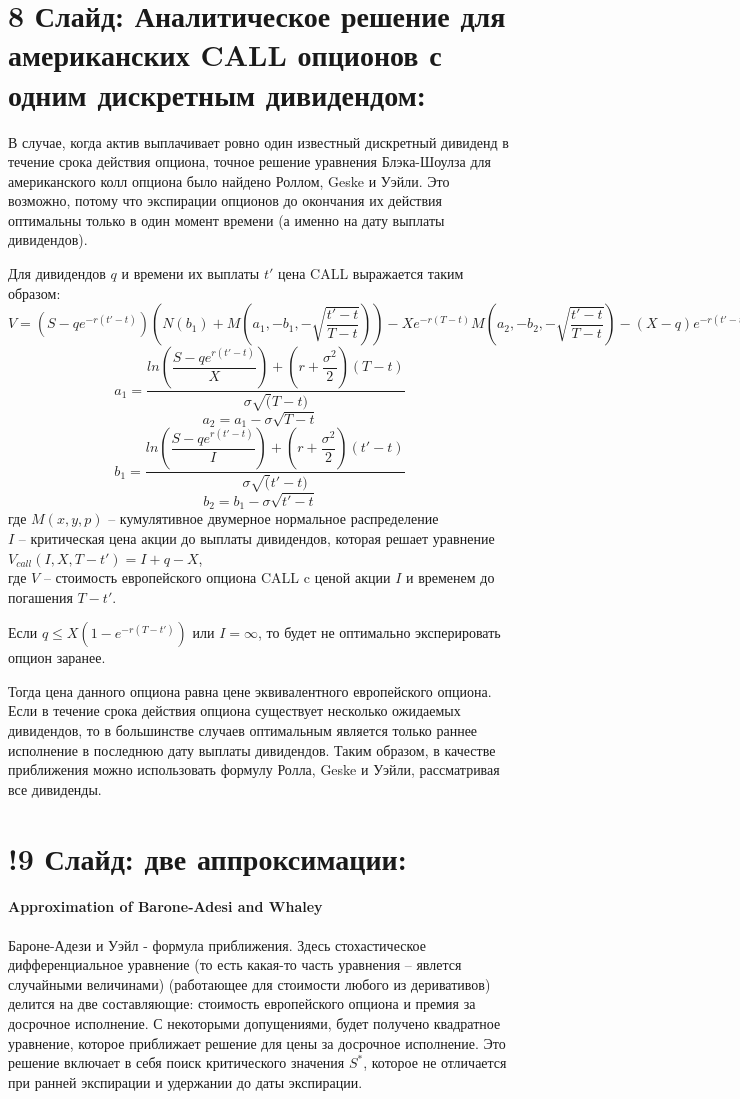 \documentclass[a4paper]{article}
\begin{document}
\section*{8 Слайд: Аналитическое решение для американских CALL опционов с одним дискретным дивидендом:}
В случае, когда актив выплачивает ровно один известный дискретный дивиденд в течение срока действия опциона, точное решение уравнения Блэка-Шоулза для американского колл опциона было найдено Роллом, Geske и Уэйли. Это возможно, потому что экспирации опционов до окончания их действия оптимальны только в один момент времени (а именно на дату выплаты дивидендов).

Для дивидендов $q$ и времени их выплаты $t'$ цена CALL выражается таким образом:
$V = \left(S - qe^{-r (t' - t)} \right) \left( N(b_1) + M \left( a_1, -b_1, - \sqrt{ \dfrac{t' - t}{T - t}} \right) \right) - Xe^{-r (T - t)}  M \left( a_2, -b_2, - \sqrt{\dfrac{t' - t}{T - t}} \right) - (X - q) e^{-r (t' - t)} N(b_2)$
\[a_1 = \dfrac{ln \left( \dfrac{S - qe^{r(t' - t)}}{X}\right) + (r + \dfrac{\sigma^2}{2}) (T-t)}{\sigma \sqrt(T - t)}\]
\[a_2 = a_1 - \sigma \sqrt{T - t}\]
\[b_1 = \dfrac{ln \left( \dfrac{S - qe^{r(t' - t)}}{I}\right) + (r + \dfrac{\sigma^2}{2}) (t'-t)}{\sigma \sqrt(t' - t)}\]
\[b_2 = b_1 - \sigma \sqrt{t' - t}\]
где $M(x,y,p)$ -- кумулятивное двумерное нормальное распределение \\
$I$ -- критическая цена акции до выплаты дивидендов, которая решает уравнение $V_{call} (I, X, T - t') = I + q - X$, \\
где $V$ -- стоимость европейского опциона CALL c ценой акции $I$ и временем до погашения $T - t'$.

Если $q \leq X (1 - e ^{-r (T - t')})$ или $I = \infty$, то будет не оптимально эксперировать опцион заранее.

Тогда цена данного опциона равна цене эквивалентного европейского опциона. Если в течение срока действия опциона существует несколько ожидаемых дивидендов, то в большинстве случаев оптимальным является только раннее исполнение в последнюю дату выплаты дивидендов. Таким образом, в качестве приближения можно использовать формулу Ролла, Geske и Уэйли, рассматривая все дивиденды.
\section*{!9 Слайд: две аппроксимации:}
\paragraph*{Approximation of Barone-Adesi and Whaley}
Бароне-Адези и Уэйл - формула приближения. Здесь стохастическое дифференциальное уравнение (то есть какая-то часть уравнения -- явлется случайными величинами) (работающее для стоимости любого из деривативов) делится на две составляющие: стоимость европейского опциона и премия за досрочное исполнение. С некоторыми допущениями, будет получено квадратное уравнение, которое приближает решение для цены за досрочное исполнение. Это решение включает в себя поиск критического значения $S^*$, которое не отличается при ранней экспирации и удержании до даты экспирации.
\end{document}
